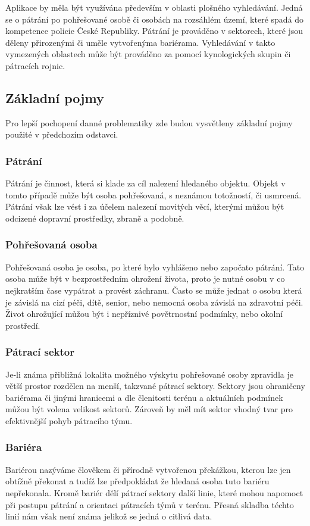 	Aplikace by měla být využívána především v oblasti plošného vyhledávání. Jedná se o pátrání po pohřešované osobě či osobách na rozsáhlém území, které spadá do kompetence policie České Republiky. Pátrání je prováděno v sektorech, které jsou děleny přirozenými či uměle vytvořenýma bariérama. Vyhledávání v takto vymezených oblastech může být prováděno za pomocí kynologických skupin či pátracích rojnic. 
	
\subsection{Základní pojmy}
	Pro lepší pochopení danné problematiky zde budou vysvětleny základní pojmy použité v předchozím odstavci.
	
\subsubsection{Pátrání}
	Pátrání je činnost, která si klade za cíl nalezení hledaného objektu. Objekt v tomto případě může být osoba pohřešovaná, s neznámou totožností, či usmrcená. Pátrání však lze vést i za účelem nalezení movitých věcí, kterými můžou být odcizené dopravní prostředky, zbraně a podobně.

\subsubsection{Pohřešovaná osoba}
	Pohřešovaná osoba je osoba, po které bylo vyhlášeno nebo započato pátrání. Tato osoba může být v bezprostředním ohrožení života, proto je nutné osobu v co nejkratším čase vypátrat a provést záchranu. Často se může jednat o osobu která je závislá na cizí péči, dítě, senior, nebo nemocná osoba závislá na zdravotní péči. Život ohrožující můžou být i nepříznivé povětrnostní podmínky, nebo okolní prostředí.
	
\subsubsection{Pátrací sektor}
	Je-li známa přibližná lokalita možného výskytu pohřešované osoby zpravidla je větší prostor rozdělen na menší, takzvané pátrací sektory. Sektory jsou ohraničeny bariérama či jinými hranicemi a dle členitosti terénu a aktuálních podmínek můžou být volena velikost sektorů. Zároveň by měl mít sektor vhodný tvar pro efektivnější pohyb pátracího týmu.
	
\subsubsection{Bariéra}
	Bariérou nazýváme člověkem či přírodně vytvořenou překážkou, kterou lze jen obtížně překonat a tudíž lze předpokládat že hledaná osoba tuto bariéru nepřekonala. Kromě bariér dělí pátrací sektory další linie, které mohou napomoct při postupu pátrání a orientaci pátracích týmů v terénu. Přesná skladba téchto linií nám však není známa jelikož se jedná o citlivá data.